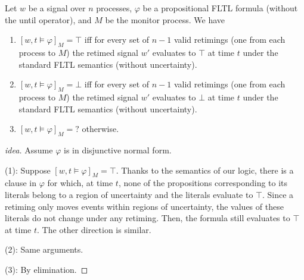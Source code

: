 \documentclass[envcountsame, runningheads]{llncs}
\newcommand{\rednote}[2][]{{\todo[color=magenta!80,size=\footnotesize,#1]{\normalcolor\normalfont#2}}}
\newcommand\alert[1]{\textcolor{red}{#1}}
\newcommand{\R}{\mathbb{R}}
\newcommand{\B}{\mathbb{B}}
\newcommand{\?}{\text{?}}
\begin{document}
	\begin{claim}
		Let $w$ be a signal over $n$ processes, $\varphi$ be a propositional FLTL formula (without the until operator), and $M$ be the monitor process.
		We have
		\begin{enumerate}
			\item $[w,t \models \varphi]_M = \top$ iff for every set of $n-1$ valid retimings (one from each process to $M$) the retimed signal $w'$ evaluates to $\top$ at time $t$ under the standard FLTL semantics (without uncertainty).
			\item $[w,t \models \varphi]_M = \bot$ iff for every set of $n-1$ valid retimings (one from each process to $M$) the retimed signal $w'$ evaluates to $\bot$ at time $t$ under the standard FLTL semantics (without uncertainty).
			\item $[w,t \models \varphi]_M = \?$ otherwise.
		\end{enumerate}
	\end{claim}
	\begin{proof}[idea]
		Assume $\varphi$ is in disjunctive normal form.
		
		(1): Suppose $[w,t \models \varphi]_M = \top$.
		Thanks to the semantics of our logic, there is a clause in $\varphi$ for which, at time $t$, none of the propositions corresponding to its literals belong to a region of uncertainty and the literals evaluate to $\top$.
		Since a retiming only moves events within regions of uncertainty, the values of these literals do not change under any retiming.
		Then, the formula still evaluates to $\top$ at time $t$. 
		The other direction is similar.
		
		(2): Same arguments.
		
		(3): By elimination.
		
	\end{proof}
	
\end{document}
